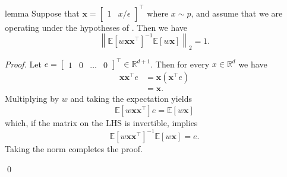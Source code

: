 \documentclass[11pt]{article}
\begin{document}
\begin{appendices}
\begin{restatable}{lemma}{} \label{lemma: pnorm bound} Suppose that $\boldsymbol{x} = \begin{bmatrix}
    1 & x/\epsilon
\end{bmatrix}^{\top}$ where $x \sim p$, and assume that we are operating under the hypotheses of . Then we have
\begin{equation}
   \left\|\mathbb{E}[w\boldsymbol{x}\boldsymbol{x}^{\top}]^{-1}\mathbb{E}[w\boldsymbol{x}]\right\|_2 =  1.
\end{equation}
\end{restatable}
\noindent \textit{Proof.} Let $e = \begin{bmatrix}
    1 & 0 & \dots & 0
\end{bmatrix}^{\top} \in \mathbb{R}^{d+1}$. Then for every $x \in \mathbb{R}^d$ we have
\begin{align*}
    \boldsymbol{x}\boldsymbol{x}^{\top}e &= \boldsymbol{x}(\boldsymbol{x}^{\top}e) \\
    &= \boldsymbol{x}.
\end{align*}
Multiplying by $w$ and taking the expectation yields
\[\mathbb{E}[w\boldsymbol{x}\boldsymbol{x}^{\top}]e = \mathbb{E}[w\boldsymbol{x}]\]
which, if the matrix on the LHS is invertible, implies
\[\mathbb{E}[w\boldsymbol{x}\boldsymbol{x}^{\top}]^{-1}\mathbb{E}[w\boldsymbol{x}] = e.\]
Taking the norm completes the proof.

\qed{}



\end{appendices}
\end{document}

